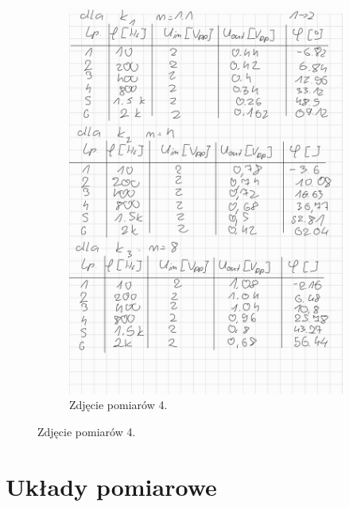 \documentclass[12pt,a4paper]{article}
\begin{document}
\begin{figure}[H]
\begin{subfigure}[b]{0.46\textwidth}
			\includegraphics[width=\textwidth]{zdjecia/4.png}
			\caption{Zdjęcie pomiarów 4.}
			\label{fig:pomiar4}
		\end{subfigure}
	\end{figure}
	
	\section{Układy pomiarowe}
	
\end{document}
